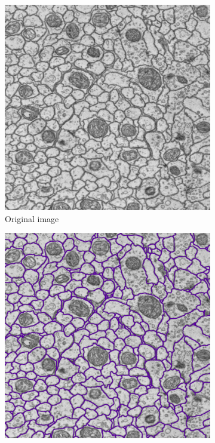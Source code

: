 \begin{figure}[!htbp]
    \centering
    \begin{subfigure}[t]{0.31\textwidth}
        \centering
        \includegraphics[height=0.9\textwidth]{./images/results/raw_1.png}
        \caption{Original image}
    \end{subfigure}%
    \begin{subfigure}[t]{0.31\textwidth}
        \centering
        \includegraphics[height=0.9\textwidth]{./images/results/pred_1.png}

\end{subfigure}
\end{figure}
